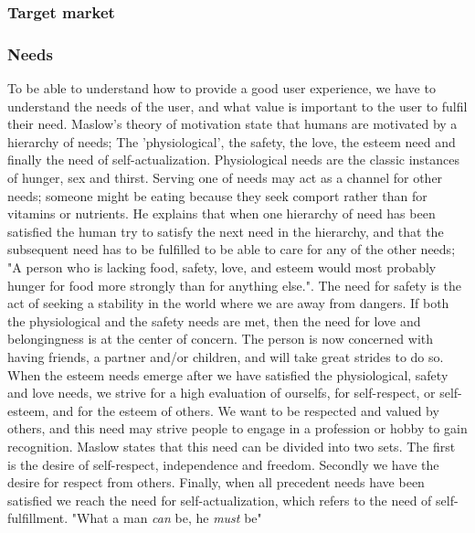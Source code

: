 \subsubsection{Target market}

\subsubsection{Needs}
To be able to understand how to provide a good user experience, we have to understand the needs of the user, and what value is important to the user to fulfil their need. Maslow’s theory of motivation \cite{Maslow1943} state that humans are motivated by a hierarchy of needs; The 'physiological', the safety, the love, the esteem need and finally the need of self-actualization. Physiological needs are the classic instances of hunger, sex and thirst. Serving one of needs may act as a channel for other needs; someone might be eating because they seek comport rather than for vitamins or nutrients. He explains that when one hierarchy of need has been satisfied the human try to satisfy the next need in the hierarchy, and that the subsequent need has to be fulfilled to be able to care for any of the other needs; "A person who is lacking food, safety, love, and esteem would most probably hunger for food more strongly than for anything else.". The need for safety is the act of seeking a stability in the world where we are away from dangers. If both the physiological and the safety needs are met, then the need for love and belongingness is at the center of concern. The person is now concerned with having friends, a partner and/or children, and will take great strides to do so. When the esteem needs emerge after we have satisfied the physiological, safety and love needs, we strive for a high evaluation of ourselfs, for self-respect, or self-esteem, and for the esteem of others. We want to be respected and valued by others, and this need may strive people to engage in a profession or hobby to gain recognition. Maslow states that this need can be divided into two sets. The first is the desire of self-respect, independence and freedom. Secondly we have the desire for respect from others. Finally, when all precedent needs have been satisfied we reach the need for self-actualization, which refers to the need of self-fulfillment. "What a man \textit{can} be, he \textit{must} be"


